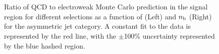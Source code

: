 \begin{figure}[h!]
  \begin{center}
     ~~
     \\
     ~~
     \\
    \caption{ Ratio of QCD to electroweak Monte Carlo prediction in the signal region for different \scalht selections as a function of \mht (Left) and $n_{\text{b}}$ (Right) for the asymmetric jet category. A constant fit to the data is represented by the red line, with the $\pm$100\% uncertainty represented by the blue hashed region.
    }
    \label{fig:asym_qcd_validation}
  \end{center} 
\end{figure}


